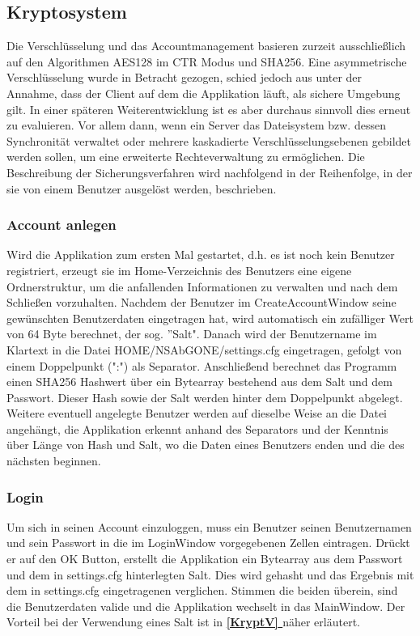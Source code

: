 \documentclass[13pt,a4paper,bibliography=totocnumbered,listof=totocnumbered]{scrartcl}
\newcommand*{\fullref}[1]{\textbf{\hyperref[{#1}]{\ref*{#1} \nameref*{#1}}}}
\begin{document}
\subsection{Kryptosystem}
Die Verschlüsselung und das Accountmanagement basieren zurzeit ausschließlich auf den Algorithmen AES128 im CTR Modus und SHA256. Eine asymmetrische Verschlüsselung wurde in Betracht gezogen, schied jedoch aus unter der Annahme, dass der Client auf dem die Applikation läuft, als sichere Umgebung gilt. In einer späteren Weiterentwicklung ist es aber durchaus sinnvoll dies erneut zu evaluieren. Vor allem dann, wenn ein Server das Dateisystem bzw. dessen Synchronität verwaltet oder mehrere kaskadierte Verschlüsselungsebenen gebildet werden sollen, um eine erweiterte Rechteverwaltung zu ermöglichen. Die Beschreibung der Sicherungsverfahren wird nachfolgend in der Reihenfolge, in der sie von einem Benutzer ausgelöst werden, beschrieben.
\subsubsection{Account anlegen}
Wird die Applikation zum ersten Mal gestartet, d.h. es ist noch kein Benutzer registriert, erzeugt sie im Home-Verzeichnis des Benutzers eine eigene Ordnerstruktur, um die anfallenden Informationen zu verwalten und nach dem Schließen vorzuhalten. Nachdem der Benutzer im CreateAccountWindow seine gewünschten Benutzerdaten eingetragen hat, wird automatisch ein zufälliger Wert von 64 Byte berechnet, der sog. ''Salt". Danach wird der Benutzername im Klartext in die Datei HOME/NSAbGONE/settings.cfg eingetragen, gefolgt von einem Doppelpunkt (":") als Separator. Anschließend berechnet das Programm einen SHA256 Hashwert über ein Bytearray bestehend aus dem Salt und dem Passwort. Dieser Hash sowie der Salt werden hinter dem Doppelpunkt abgelegt. Weitere eventuell angelegte Benutzer werden auf dieselbe Weise an die Datei angehängt, die Applikation erkennt anhand des Separators und der Kenntnis über Länge von Hash und Salt, wo die Daten eines Benutzers enden und die des nächsten beginnen.
\subsubsection{Login}
Um sich in seinen Account einzuloggen, muss ein Benutzer seinen Benutzernamen und sein Passwort in die im LoginWindow vorgegebenen Zellen eintragen. Drückt er auf den OK Button, erstellt die Applikation ein Bytearray aus dem Passwort und dem in settings.cfg hinterlegten Salt. Dies wird gehasht und das Ergebnis mit dem in settings.cfg eingetragenen verglichen. Stimmen die beiden überein, sind die Benutzerdaten valide und die Applikation wechselt in das MainWindow. Der Vorteil bei der Verwendung eines Salt ist in \fullref{KryptV} näher erläutert.
\end{document}
